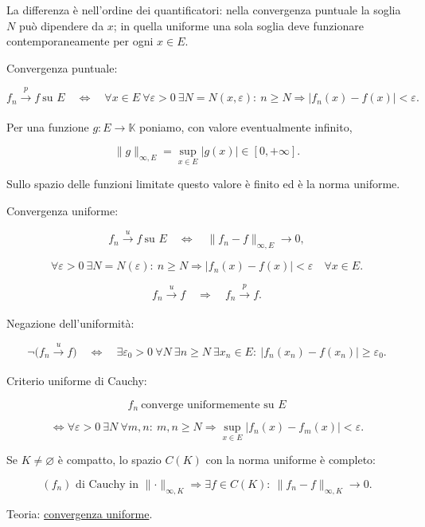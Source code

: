 La differenza è nell'ordine dei quantificatori: nella convergenza puntuale la soglia \(N\) può dipendere da \(x\); in quella uniforme una sola soglia deve funzionare contemporaneamente per ogni \(x\in E\).

Convergenza puntuale:

\[
\displaystyle
f_n\xrightarrow[]{p}f\ \text{su }E
\quad\Longleftrightarrow\quad
\forall x\in E\ \forall\varepsilon>0\ \exists N=N(x,\varepsilon):
\ n\ge N
\Longrightarrow
\lvert f_n(x)-f(x)\rvert<\varepsilon.
\]

Per una funzione \(g:E\to\mathbb K\) poniamo, con valore eventualmente infinito,

\[
\displaystyle
\lVert g\rVert_{\infty,E}
=
\sup_{x\in E}\lvert g(x)\rvert\in[0,+\infty].
\]

Sullo spazio delle funzioni limitate questo valore è finito ed è la norma uniforme.

Convergenza uniforme:

\[
\displaystyle
f_n\xrightarrow[]{u}f\ \text{su }E
\quad\Longleftrightarrow\quad
\lVert f_n-f\rVert_{\infty,E}\to0,
\]

\[
\displaystyle
\forall\varepsilon>0\ \exists N=N(\varepsilon):
\ n\ge N
\Longrightarrow
\lvert f_n(x)-f(x)\rvert<\varepsilon
\quad\forall x\in E.
\]

\[
\displaystyle
f_n\xrightarrow[]{u}f
\quad\Longrightarrow\quad
f_n\xrightarrow[]{p}f.
\]

Negazione dell'uniformità:

\[
\displaystyle
\neg\bigl(f_n\xrightarrow[]{u}f\bigr)
\quad\Longleftrightarrow\quad
\exists\varepsilon_0>0\ \forall N\ \exists n\ge N\ \exists x_n\in E:
\ \lvert f_n(x_n)-f(x_n)\rvert\ge\varepsilon_0.
\]

Criterio uniforme di Cauchy:

\[
\displaystyle
f_n\ \text{converge uniformemente su }E
\]

\[
\displaystyle
\Longleftrightarrow
\forall\varepsilon>0\ \exists N\ \forall m,n:
\ m,n\ge N
\Longrightarrow
\sup_{x\in E}\lvert f_n(x)-f_m(x)\rvert<\varepsilon.
\]

Se \(K\ne\varnothing\) è compatto, lo spazio \(C(K)\) con la norma uniforme è completo:

\[
(f_n)\text{ di Cauchy in }\lVert\cdot\rVert_{\infty,K}
\Longrightarrow
\exists f\in C(K):\ \lVert f_n-f\rVert_{\infty,K}\to0.
\]

Teoria: \href{https://ingegnerismo.it/matematica/convergenza-uniforme/}{convergenza uniforme}.

